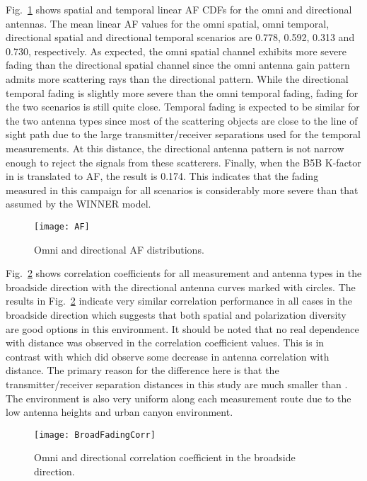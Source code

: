 \documentclass[12pt]{IEEEtran}
\begin{document}
Fig.~\ref{fg.AF} shows spatial and temporal linear AF CDFs for the omni and directional antennas.  The mean linear AF values for the omni spatial, omni temporal, directional spatial and directional temporal scenarios are 0.778, 0.592, 0.313 and 0.730, respectively.  As expected, the omni spatial channel exhibits more severe fading than the directional spatial channel since the omni antenna gain pattern admits more scattering rays than the directional pattern.  While the directional temporal fading is slightly more severe than the omni temporal fading, fading for the two scenarios is still quite close.  Temporal fading is expected to be similar for the two antenna types since most of the scattering objects are close to the line of sight path due to the large transmitter/receiver separations used for the temporal measurements.  At this distance, the directional antenna pattern is not narrow enough to reject the signals from these scatterers.  Finally, when the B5B K-factor in \cite{winner-2005} is translated to AF, the result is 0.174.  This indicates that the fading measured in this campaign for all scenarios is considerably more severe than that assumed by the WINNER model.


\begin{figure}[htbp]
\centerline{\texttt{[image: AF]}}
\caption{Omni and directional AF distributions.}
\label{fg.AF}
\end{figure}


Fig.~\ref{fg.brdCorr} shows correlation coefficients for all measurement and antenna types in the broadside direction with the directional antenna curves marked with circles.  The results in Fig.~\ref{fg.brdCorr} indicate very similar correlation performance in all cases in the broadside direction which suggests that both spatial and polarization diversity are good options in this environment.  It should be noted that no real dependence with distance was observed in the correlation coefficient values.  This is in contrast with \cite{erceg-v-2004} which did observe some decrease in antenna correlation with distance.  The primary reason for the difference here is that the transmitter/receiver separation distances in this study are much smaller than \cite{erceg-v-2004}.  The environment is also very uniform along each measurement route due to the low antenna heights and urban canyon environment.  


\begin{figure}[htbp]
\centerline{\texttt{[image: BroadFadingCorr]}}
\caption{Omni and directional correlation coefficient in the broadside direction.}
\label{fg.brdCorr}
\end{figure}
\end{document}
